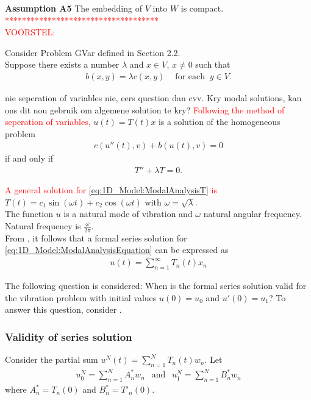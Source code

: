 \documentclass[../../main.tex]{subfiles}
\begin{document}
\textbf{Assumption A5} The embedding of $V$ into $W$ is compact.\\


\textcolor{red}{************************************}\\
\textcolor{red}{VOORSTEL:}

Consider Problem GVar defined in Section 2.2.\\

Suppose there exists a number $\lambda$ and $x \in V$, $x \neq 0$ such that
\begin{eqnarray}
	b(x,y) = \lambda c(x,y) \ \ \ \ \textrm{ for each } \ y \in V. \label{eq:1D_Model:ModalAnalysisEquation}
\end{eqnarray}

nie seperation of variables nie, eers question dan cvv. Kry modal solutions, kan ons dit nou gebruik om algemene solution te kry?
\textcolor{red}{Following the method of seperation of variables,} $u(t) = T(t)x$ is a solution of the homogeneous problem
\begin{eqnarray}
	c(u''(t),v) + b(u(t),v) = 0
\end{eqnarray}
if and only if
\begin{eqnarray}
	T''  + \lambda T = 0. \label{eq:1D_Model:ModalAnalysisT}
\end{eqnarray}

\textcolor{red}{A general solution for \eqref{eq:1D_Model:ModalAnalysisT} is} $T(t) = c_1 \sin(\omega t) + c_2 \cos(\omega t)$ with $\omega = \sqrt{\lambda}$.\\

The function $u$ is a natural mode of vibration and $\omega$ natural angular frequency. Natural frequency is $\frac{\omega}{2 \pi}$.\\

From \cite{CVV18}, it follows that a formal series solution for \eqref{eq:1D_Model:ModalAnalysisEquation} can be expressed as
\begin{eqnarray}
	u(t) = \sum_{n=1}^{\infty} T_n(t)x_n \label{eq:1D_Model:ModalAnalysisSeriesSolution}
\end{eqnarray}

The following question is considered: When is the formal series solution valid for the vibration problem with initial values $u(0) = u_0$ and $u'(0) = u_1$? To answer this question, consider \cite{CVV18}.\\

\subsubsection{Validity of series solution}
Consider the partial sum $u^{N}(t) = \sum_{n=1}^{N} T_{n}(t)w_n$. Let
\begin{eqnarray*}
	u_0^{N} = \sum_{n=1}^{N} A^*_n w_n \ \ \textrm{ and } \ \ u_{1}^{N} =\sum_{n=1}^{N} B^*_n w_n
\end{eqnarray*} where $A^*_n = T_n(0)$ and $B^*_n = T'_n(0)$.\\
\end{document}
